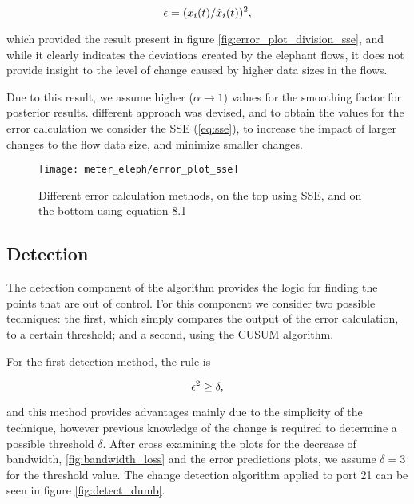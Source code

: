 \begin{equation}
    \centering
    \label{eq:division}
    \epsilon = (x_i(t)/\hat{x}_i(t))^2,
\end{equation}

\par which provided the result present in figure \ref{fig:error_plot_division_sse}, and while it clearly indicates the deviations created by the elephant flows, it does not provide insight to the level of change caused by higher data sizes in the flows.

Due to this result, we assume higher ($\alpha \rightarrow 1$) values for the smoothing factor for posterior results. different approach was devised,
and to obtain the values for the error calculation we consider the SSE (\ref{eq:sse}), to increase the impact of larger changes to the flow data size,
and minimize smaller changes.

\begin{figure} [H]
    \centering
    \texttt{[image: meter\_eleph/error\_plot\_sse]}
    \caption{Different error calculation methods, on the top using SSE, and on the bottom using equation 8.1}
\end{figure}

\subsection{Detection}

The detection component of the algorithm provides the logic for finding the points that are out of control. For this component we consider two possible techniques: the first, which simply compares the output of the error calculation, to a certain threshold; 
and a second, using the CUSUM algorithm. 

\par For the first detection method, the rule is 

\begin{equation*}
    \centering
    \label{eq:division}
    \epsilon^2 \geq \delta,
\end{equation*}

\par and this method provides advantages mainly due to the simplicity of the technique, however previous knowledge of the change is required to determine a possible threshold $\delta$. After cross examining the plots for the decrease of bandwidth, 
\ref{fig:bandwidth_loss} and the error predictions plots, we assume $\delta = 3$ for the threshold value. The change detection algorithm applied to port 21 can be seen in figure \ref{fig:detect_dumb}.

